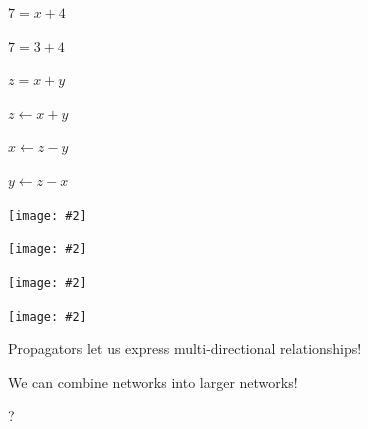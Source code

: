 \documentclass[usenames,dvipsnames,svgnames,table,aspectratio=1610,mathserif]{beamer}
\newcommand{\nl}{\vspace{\baselineskip}}
\newcommand{\textslide}[1]{{
\begin{frame}
\begin{center}

#1

\end{center}
\end{frame}
}}
\newcommand{\imageslide}[2][1]{{
\begin{frame}\begin{center}
\texttt{[image: \#2]}
\end{center}\end{frame}
}}
\begin{document}
\begin{frame}
  \begin{center}
    \begin{LARGE}
      $7 = x + 4$
    \end{LARGE}
  \end{center}
\end{frame}


\begin{frame}
  \begin{center}
    \begin{LARGE}
      $7 = 3 + 4$
    \end{LARGE}
  \end{center}
\end{frame}


\begin{frame}
  \begin{center}
    \begin{LARGE}
      $z = x + y$
    \end{LARGE}
  \end{center}
\end{frame}


\begin{frame}
  \begin{center}
    \begin{LARGE}
      $z \leftarrow x + y$

      \nl

      $x \leftarrow z - y$

      \nl

      $y \leftarrow z - x$

    \end{LARGE}
  \end{center}
\end{frame}


\imageslide{badd1.pdf}
\imageslide{badd2.pdf}
\imageslide{badd3.pdf}
\imageslide{badd4.pdf}


\begin{frame}
\begin{center}
{\LARGE Propagators let us express multi-directional relationships!}
\end{center}
\end{frame}



\textslide{
\Large{We can combine networks into larger networks!}
}

\textslide{\Huge{?}}


\end{document}
